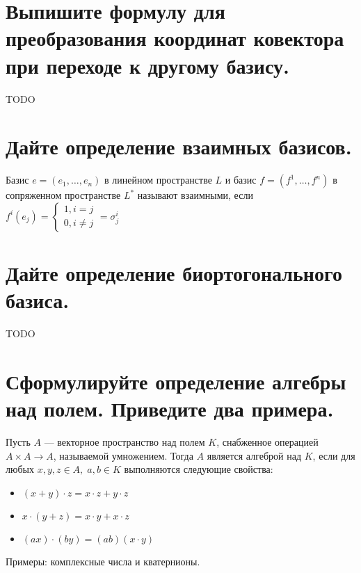 \documentclass{article}
\begin{document}
\section{Выпишите формулу для преобразования координат ковектора при переходе к другому базису.}
TODO

\section{Дайте определение взаимных базисов.}
Базис $e = (e_1, \ldots , e_n)$ в линейном пространстве $L$ и
базис $f = (f^1, \ldots , f^n)$ в сопряженном пространстве $L^*$
называют взаимными, если
$
f^i(e_j) =
\begin{cases}
    1, i = j\\
    0, i \neq j
\end{cases} = \sigma^i_j
$

\section{Дайте определение биортогонального базиса.}
TODO

\section{Сформулируйте определение алгебры над полем. Приведите два примера.}
Пусть $A$ — векторное пространство над полем $K$,
снабженное операцией $A\times A\to A$, называемой умножением. 
Тогда $A$ является алгеброй над $K$, если для любых $x,y,z\in A, \; a,b\in K$
выполняются следующие свойства:
\begin{itemize}
    \item $(x+y)\cdot z=x\cdot z+y\cdot z$
    \item $x\cdot (y+z)=x\cdot y+x\cdot z$
    \item $(ax)\cdot (by)=(ab)(x\cdot y)$
\end{itemize}
Примеры: комплексные числа и кватернионы.    
\end{document}
